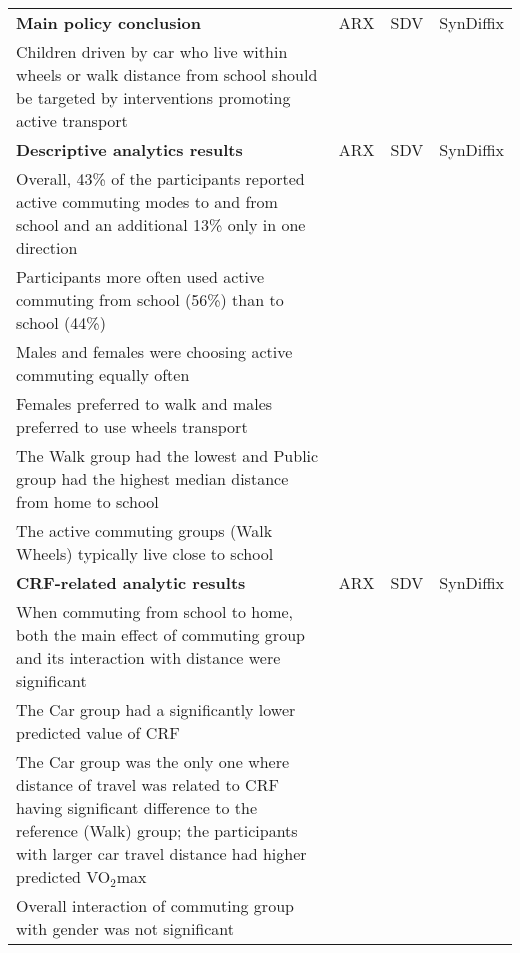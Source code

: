 \documentclass[10pt]{article}
\newcommand{\cmark}{\textcolor{green}{\ding{51}}}  %
\newcommand{\xmark}{\textcolor{red}{\ding{55}}}    %
\newcommand{\omark}{\textcolor{yellow}{\ding{109}}} %
\newcommand{\cmark}{\textbf{O }}
\newcommand{\xmark}{\textbf{X }}
\newcommand{\omark}{? }
\begin{document}
\begin{table}
\begin{center}
\begin{small}
\begin{tabularx}{\textwidth}{Xlll}
\toprule
\textbf{Main policy conclusion}  & ARX & SDV & SynDiffix \\
Children driven by car who live
within wheels or walk distance from school should be targeted by interventions promoting active transport & \cmark & \xmark & \cmark \\
\midrule
\textbf{Descriptive analytics results}  & ARX & SDV & SynDiffix \\
Overall, 43\% of the participants reported active commuting modes to and from school and an additional 13\%
only in one direction & \cmark & \xmark & \cmark \\
Participants more often used active commuting from school (56\%) than to school (44\%) & \cmark & \cmark & \cmark \\
Males and females were choosing active commuting equally often & \cmark & \cmark & \cmark \\
Females preferred to walk and males preferred to use wheels transport & \cmark & \xmark & \cmark \\
The Walk group had the lowest and Public group had the highest median distance from home to school & \cmark & \xmark & \cmark \\
The active commuting groups (Walk Wheels) typically live close to school & \cmark & \xmark & \cmark \\
\midrule
\textbf{CRF-related analytic results}  & ARX & SDV & SynDiffix \\
When commuting from school to home, both the main effect of commuting group and its interaction with
distance were significant & \cmark & \xmark & \cmark \\
The Car group had a significantly lower predicted value of CRF & \cmark & \xmark & \cmark \\
The Car group was the only one where distance of travel was related to CRF having significant difference to the reference (Walk) group; the participants with larger car travel distance had higher predicted VO$_2$max & \cmark & \xmark & \omark \\
Overall interaction of commuting group with gender was not significant  & \omark & \cmark & \omark \\

\end{tabularx}
\end{small}
\end{center}
\end{table}
\end{document}

